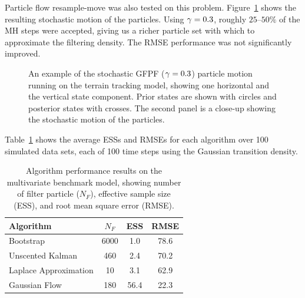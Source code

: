 \documentclass{article}
\begin{document}
Particle flow resample-move was also tested on this problem. Figure~\ref{fig:drone_example_frame_stochastic} shows the resulting stochastic motion of the particles. Using $\gamma=0.3$, roughly $25$--$50\%$ of the MH steps were accepted, giving us a richer particle set with which to approximate the filtering density. The RMSE performance was not significantly improved.
%
\begin{figure}
\centering
{}
\caption{An example of the stochastic GFPF ($\gamma=0.3$) particle motion running on the terrain tracking model, showing one horizontal and the vertical state component. Prior states are shown with circles and posterior states with crosses. The second panel is a close-up showing the stochastic motion of the particles.}
\label{fig:drone_example_frame_stochastic}
\end{figure}

Table~\ref{tab:drone_results_gaussian} shows the average ESSs and RMSEs for each algorithm over 100 simulated data sets, each of 100 time steps using the Gaussian transition density.
%
\begin{table}
\centering
\begin{tabular}{l||c|c|c}
Algorithm                                & $N_F$ & ESS  & RMSE \\
\hline
Bootstrap                                &  6000 &  1.0 & 78.6 \\
Unscented Kalman                         &   460 &  2.4 & 70.2 \\
Laplace Approximation                    &    10 &  3.1 & 62.9 \\
Gaussian Flow                            &   180 & 56.4 & 22.3 \\
\end{tabular}
\caption{Algorithm performance results on the multivariate benchmark model, showing number of filter particle ($N_F$), effective sample size (ESS), and root mean square error (RMSE).}
\label{tab:drone_results_gaussian}
\end{table}
\end{document}
